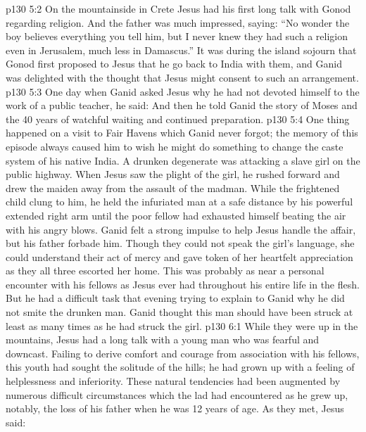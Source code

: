 \vs p130 5:2 On the mountainside in Crete Jesus had his first long talk with Gonod regarding religion. And the father was much impressed, saying: “No wonder the boy believes everything you tell him, but I never knew they had such a religion even in Jerusalem, much less in Damascus.” It was during the island sojourn that Gonod first proposed to Jesus that he go back to India with them, and Ganid was delighted with the thought that Jesus might consent to such an arrangement.
\vs p130 5:3 One day when Ganid asked Jesus why he had not devoted himself to the work of a public teacher, he said:  And then he told Ganid the story of Moses and the 40 years of watchful waiting and continued preparation.
\vs p130 5:4 One thing happened on a visit to Fair Havens which Ganid never forgot; the memory of this episode always caused him to wish he might do something to change the caste system of his native India. A drunken degenerate was attacking a slave girl on the public highway. When Jesus saw the plight of the girl, he rushed forward and drew the maiden away from the assault of the madman. While the frightened child clung to him, he held the infuriated man at a safe distance by his powerful extended right arm until the poor fellow had exhausted himself beating the air with his angry blows. Ganid felt a strong impulse to help Jesus handle the affair, but his father forbade him. Though they could not speak the girl’s language, she could understand their act of mercy and gave token of her heartfelt appreciation as they all three escorted her home. This was probably as near a personal encounter with his fellows as Jesus ever had throughout his entire life in the flesh. But he had a difficult task that evening trying to explain to Ganid why he did not smite the drunken man. Ganid thought this man should have been struck at least as many times as he had struck the girl.
\vs p130 6:1 While they were up in the mountains, Jesus had a long talk with a young man who was fearful and downcast. Failing to derive comfort and courage from association with his fellows, this youth had sought the solitude of the hills; he had grown up with a feeling of helplessness and inferiority. These natural tendencies had been augmented by numerous difficult circumstances which the lad had encountered as he grew up, notably, the loss of his father when he was 12 years of age. As they met, Jesus said: 
